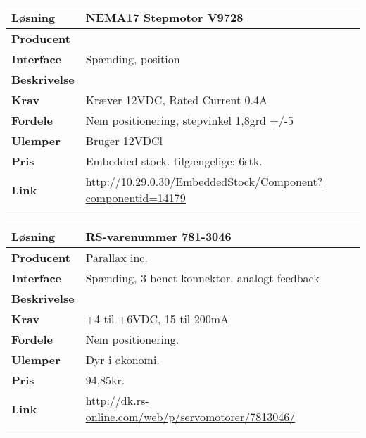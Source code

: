 \begin{table}[H] \centering
\begin{tabular}{|p{3cm}|p{11cm}|}
	\hline
	\textbf{Løsning}		
	    & NEMA17 Stepmotor V9728
	\\ \hline
	\textbf{Producent} 		
	    & 
	\\ \hline
	\textbf{Interface} 		
	    & Spænding, position
	\\ \hline
	\textbf{Beskrivelse} 	
	    & 
	\\ \hline
	\textbf{Krav} 			
	    & Kræver 12VDC, Rated Current 0.4A
	\\ \hline
	\textbf{Fordele}		
	    & Nem positionering, stepvinkel 1,8grd +/-5
	\\ \hline
	\textbf{Ulemper} 		
	    & Bruger 12VDCl
	\\ \hline
	\textbf{Pris} 			
	    & Embedded stock. tilgængelige: 6stk.
	\\ \hline
	\textbf{Link} 			
	    & \url{http://10.29.0.30/EmbeddedStock/Component?componentid=14179}
	\\ \hline
	\multicolumn{2}{|c|}{} 
    \\ \hline
\end{tabular}
\end{table}

\begin{table}[H] \centering
\begin{tabular}{|p{3cm}|p{11cm}|}
	\hline
	\textbf{Løsning}		
	    & RS-varenummer 781-3046 
	\\ \hline
	\textbf{Producent} 		
	    & Parallax inc.
	\\ \hline
	\textbf{Interface} 		
	    & Spænding, 3 benet konnektor, analogt feedback
	\\ \hline
	\textbf{Beskrivelse} 	
	    & 
	\\ \hline
	\textbf{Krav} 			
	    & +4 til +6VDC, 15 til 200mA
	\\ \hline
	\textbf{Fordele}		
	    & Nem positionering.
	\\ \hline
	\textbf{Ulemper} 		
	    & Dyr i økonomi.
	\\ \hline
	\textbf{Pris} 			
	    & 94,85kr.
	\\ \hline
	\textbf{Link} 			
	    & \url{http://dk.rs-online.com/web/p/servomotorer/7813046/}
	\\ \hline
	\multicolumn{2}{|c|}{} 
    \\ \hline
\end{tabular}
\end{table}

